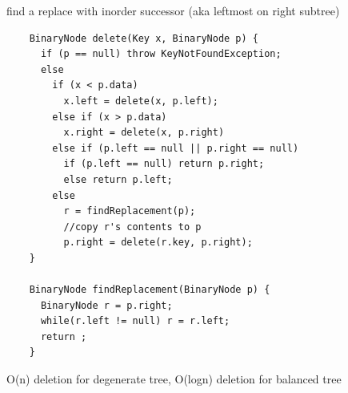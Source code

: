 \documentclass{article}
\begin{document}
  \Delete find a replace with inorder successor (aka leftmost on right subtree)
  \begin{lstlisting} 
    BinaryNode delete(Key x, BinaryNode p) {
      if (p == null) throw KeyNotFoundException;
      else 
        if (x < p.data)
          x.left = delete(x, p.left);
        else if (x > p.data)
          x.right = delete(x, p.right)
        else if (p.left == null || p.right == null) 
          if (p.left == null) return p.right;
          else return p.left;
        else 
          r = findReplacement(p);
          //copy r's contents to p
          p.right = delete(r.key, p.right);
    }

    BinaryNode findReplacement(BinaryNode p) {
      BinaryNode r = p.right;
      while(r.left != null) r = r.left;
      return ;
    }
  \end{lstlisting}
  \indent \indent O(n) deletion for degenerate tree, O(logn) deletion for balanced tree
\end{document}
